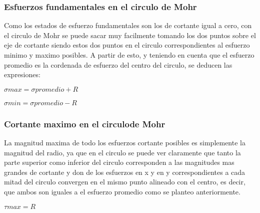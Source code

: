 \documentclass[12Pt]{article}
\begin{document}
\begin{titlepage}
\subsubsection{Esfuerzos fundamentales en el circulo de Mohr}

Como los estados de esfuerzo fundamentales son los de cortante igual a cero, con el circulo de Mohr se puede sacar muy facilmente tomando los dos puntos sobre el eje de cortante siendo estos dos puntos en el circulo correspondientes al esfuerzo minimo y maximo posibles. A partir de esto, y teniendo en cuenta que el esfuerzo promedio es la cordenada de esfuerzo del centro del circulo, se deducen las expresiones:

$ \sigma max = \sigma promedio + R $

$ \sigma min = \sigma promedio - R $

\subsubsection{Cortante maximo en el circulode Mohr}

La magnitud maxima de todo los esfuerzos cortante posibles es simplemente la magnitud del radio, ya que en el circulo se puede ver claramente que tanto la parte superior como inferior del circulo corresponden a las magnitudes mas grandes de cortante y don de los esfuerzos en x y en y correspondientes a cada mitad del circulo convergen en el mismo punto alineado con el centro, es decir, que ambos son iguales a el esfuerzo promedio como se planteo anteriormente.

$ \tau max = R $







\end{titlepage}
\end{document}
